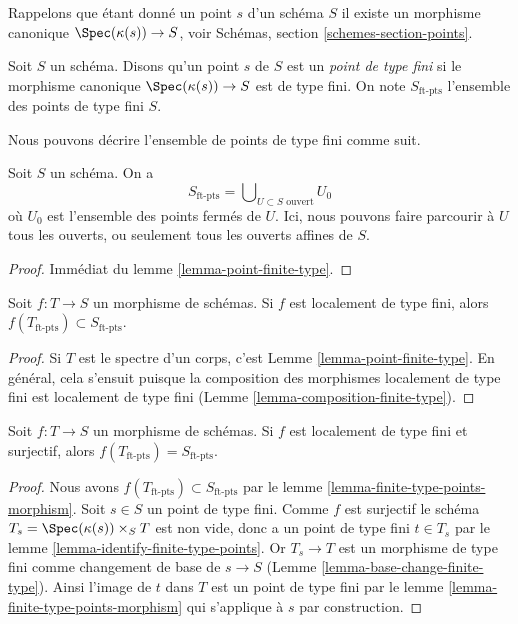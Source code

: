 \noindent
Rappelons que étant donné un point $s$ d'un schéma $S$
il existe un morphisme canonique $\Spec(\kappa(s)) \to S$,
voir Schémas, section \ref{schemes-section-points}.

\begin{definition}
\label{definition-finite-type-point}
Soit $S$ un schéma.
Disons qu'un point $s$ de $S$ est un {\it
point de type fini} si le morphisme canonique $\Spec(\kappa(s)) \to S$ est de type
fini. On note $S_{\text{ft-pts}}$ l'ensemble des points de type fini $S$.
\end{definition}

\noindent
Nous pouvons décrire l'ensemble de points de type fini comme suit.

\begin{lemma}
\label{lemma-identify-finite-type-points}
Soit $S$ un schéma. On a
$$
S_{\text{ft-pts}} = \bigcup\nolimits_{U \subset S\text{ ouvert}} U_0
$$
où $U_0$ est l'ensemble des points fermés de $U$. Ici, nous pouvons
faire parcourir à $U$ tous les ouverts, ou seulement tous les ouverts affines de $S$.
\end{lemma}

\begin{proof}
Immédiat du lemme \ref{lemma-point-finite-type}.
\end{proof}

\begin{lemma}
\label{lemma-finite-type-points-morphism}
Soit $f : T \to S$ un morphisme de schémas.
Si $f$ est localement
de type fini, alors $f(T_{\text{ft-pts}}) \subset S_{\text{ft-pts}}$.
\end{lemma}

\begin{proof}
Si $T$ est le spectre d'un corps, c'est Lemme \ref{lemma-point-finite-type}. En général,
cela s'ensuit puisque la composition des morphismes localement
de type fini est localement de type fini (Lemme \ref{lemma-composition-finite-type}).
\end{proof}

\begin{lemma}
\label{lemma-finite-type-points-surjective-morphism}
Soit $f : T \to S$ un morphisme de schémas.
Si $f$ est localement de type fini
et surjectif, alors $f(T_{\text{ft-pts}}) = S_{\text{ft-pts}}$.
\end{lemma}

\begin{proof}
Nous avons $f(T_{\text{ft-pts}}) \subset S_{\text{ft-pts}}$ par le lemme \ref{lemma-finite-type-points-morphism}. Soit
$s \in S$ un point de type fini.
Comme $f$ est surjectif le schéma $T_s = \Spec(\kappa(s)) \times_S T$ est
non vide, donc a un point de type fini $t \in T_s$
par le lemme \ref{lemma-identify-finite-type-points}. Or
$T_s \to T$ est un morphisme de type fini
comme changement de base de $s \to S$ (Lemme
\ref{lemma-base-change-finite-type}).
Ainsi l'image de $t$ dans
$T$ est un point de type fini par le
lemme \ref{lemma-finite-type-points-morphism} qui s'applique à $s$
par construction.
\end{proof}

